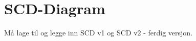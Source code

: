 \section{SCD-Diagram}
\thispagestyle{fancy}

Må lage til og legge inn SCD v1 og SCD v2 - ferdig versjon.